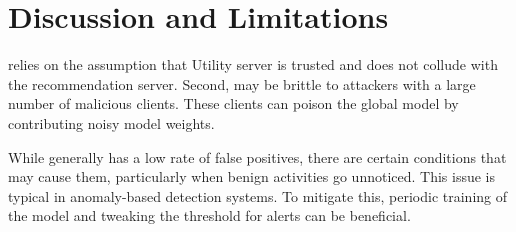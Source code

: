 \section{Discussion and Limitations}
\label{sec:discussion}

 \Sys relies on the assumption that Utility server is trusted and does not collude with the recommendation server. Second, \Sys may be brittle to attackers with a large number of malicious clients. These clients can poison the global model by contributing noisy model weights.

 While \Sys generally has a low rate of false positives, there are certain conditions that may cause them, particularly when benign activities go unnoticed. This issue is typical in anomaly-based detection systems. To mitigate this, periodic training of the model and tweaking the threshold for alerts can be beneficial.